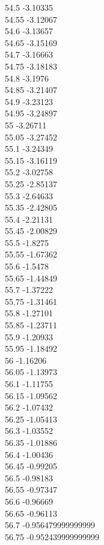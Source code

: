 {54.5	-3.10335\\
54.55	-3.12067\\
54.6	-3.13657\\
54.65	-3.15169\\
54.7	-3.16663\\
54.75	-3.18183\\
54.8	-3.1976\\
54.85	-3.21407\\
54.9	-3.23123\\
54.95	-3.24897\\
55	-3.26711\\
55.05	-3.27452\\
55.1	-3.24349\\
55.15	-3.16119\\
55.2	-3.02758\\
55.25	-2.85137\\
55.3	-2.64633\\
55.35	-2.42805\\
55.4	-2.21131\\
55.45	-2.00829\\
55.5	-1.8275\\
55.55	-1.67362\\
55.6	-1.5478\\
55.65	-1.44849\\
55.7	-1.37222\\
55.75	-1.31461\\
55.8	-1.27101\\
55.85	-1.23711\\
55.9	-1.20933\\
55.95	-1.18492\\
56	-1.16206\\
56.05	-1.13973\\
56.1	-1.11755\\
56.15	-1.09562\\
56.2	-1.07432\\
56.25	-1.05413\\
56.3	-1.03552\\
56.35	-1.01886\\
56.4	-1.00436\\
56.45	-0.99205\\
56.5	-0.98183\\
56.55	-0.97347\\
56.6	-0.96669\\
56.65	-0.96113\\
56.7	-0.956479999999999\\
56.75	-0.952439999999999\\
}
